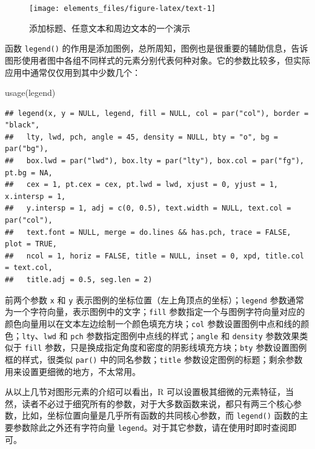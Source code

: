 \documentclass[
  b5paper,
  UTF8,twoside]{book}
\newenvironment{Shaded}{\begin{snugshade}}{\end{snugshade}}
\newcommand{\FunctionTok}[1]{\textcolor[rgb]{0.00,0.00,0.00}{#1}}
\newcommand{\NormalTok}[1]{#1}
\begin{document}
\begin{figure}

{\centering \texttt{[image: elements\_files/figure-latex/text-1]} 

}

\caption{添加标题、任意文本和周边文本的一个演示}\label{fig:text}
\end{figure}

函数 \texttt{legend()} 的作用是添加图例，总所周知，图例也是很重要的辅助信息，告诉图形使用者图中各组不同样式的元素分别代表何种对象。它的参数比较多，但实际应用中通常仅仅用到其中少数几个：

\begin{Shaded}
\begin{Highlighting}[]
\FunctionTok{usage}\NormalTok{(legend)}
\end{Highlighting}
\end{Shaded}

\begin{verbatim}
## legend(x, y = NULL, legend, fill = NULL, col = par("col"), border = "black",
##   lty, lwd, pch, angle = 45, density = NULL, bty = "o", bg = par("bg"),
##   box.lwd = par("lwd"), box.lty = par("lty"), box.col = par("fg"), pt.bg = NA,
##   cex = 1, pt.cex = cex, pt.lwd = lwd, xjust = 0, yjust = 1, x.intersp = 1,
##   y.intersp = 1, adj = c(0, 0.5), text.width = NULL, text.col = par("col"),
##   text.font = NULL, merge = do.lines && has.pch, trace = FALSE, plot = TRUE,
##   ncol = 1, horiz = FALSE, title = NULL, inset = 0, xpd, title.col = text.col,
##   title.adj = 0.5, seg.len = 2)
\end{verbatim}

前两个参数 \texttt{x} 和 \texttt{y} 表示图例的坐标位置（左上角顶点的坐标）；\texttt{legend} 参数通常为一个字符向量，表示图例中的文字；\texttt{fill} 参数指定一个与图例字符向量对应的颜色向量用以在文本左边绘制一个颜色填充方块；\texttt{col} 参数设置图例中点和线的颜色；\texttt{lty}、\texttt{lwd} 和 \texttt{pch} 参数指定图例中点线的样式；\texttt{angle} 和 \texttt{density} 参数效果类似于 \texttt{fill} 参数，只是换成指定角度和密度的阴影线填充方块；\texttt{bty} 参数设置图例框的样式，很类似 \texttt{par()} 中的同名参数；\texttt{title} 参数设定图例的标题；剩余参数用来设置更细微的地方，不太常用。

从以上几节对图形元素的介绍可以看出，R 可以设置极其细微的元素特征，当然，读者不必过于细究所有的参数，对于大多数函数来说，都只有两三个核心参数，比如，坐标位置向量是几乎所有函数的共同核心参数，而 \texttt{legend()} 函数的主要参数除此之外还有字符向量 \texttt{legend}。对于其它参数，请在使用时即时查阅即可。
\end{document}

